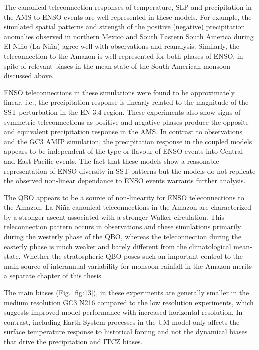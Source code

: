   
The canonical teleconnection responses  of  temperature, SLP and precipitation in the AMS to ENSO events are well represented in these models. For example, the simulated spatial patterns and strength of the positive (negative) precipitation anomalies observed in northern Mexico and South Eastern South America during El Ni\~no (La Ni\~na) agree well with observations and reanalysis.
 Similarly, the teleconnection to the Amazon is well represented for both phases of ENSO, in spite of relevant biases in the mean state of the South American monsoon discussed above. %
 
ENSO teleconnections in these simulations were found to be approximately linear, i.e., the precipitation response is linearly related to the magnitude of the SST perturbation in the EN 3.4 region. These experiments also show signs of symmetric teleconnections as positive and negative phases produce the opposite and equivalent precipitation response in the AMS. In contrast to observations and the GC3 AMIP simulation, the precipitation response in the coupled models appears to be independent of the type or flavour of ENSO events into Central and East Pacific events. The fact that these models show a reasonable representation of ENSO diversity in SST patterns but the models  do not replicate the observed non-linear dependance to ENSO events warrants further analysis.

The QBO appears to be a source of non-linearity for ENSO teleconnections to the Amazon. La Niña canonical teleconnections in the Amazon are characterized by a stronger ascent associated with a stronger Walker circulation. This teleconnection pattern occurs in observations and these simulations primarily during the westerly phase of the QBO, whereas the teleconnection during the easterly phase is much weaker and barely different from the climatological mean-state. Whether the stratospheric QBO poses such an important control to the main source of interannual variability for monsoon rainfall in the Amazon merits a separate chapter of this thesis. 

The main biases (Fig. \ref{fig:13}), in these experiments are generally smaller in the medium resolution GC3 N216 compared to the low resolution experiments, which suggests improved model performance with increased horizontal resolution.
In contrast, including Earth System processes in the UM model only affects the surface temperature response to historical forcing and not the dynamical biases that drive the precipitation and ITCZ biases. 

